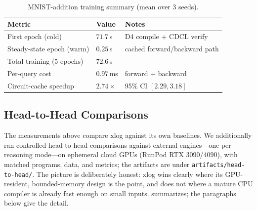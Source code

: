 \begin{table}[htbp]
  \centering
  \caption{MNIST-addition training summary (mean over 3 seeds).}
  \label{tab:training-summary}
  \small
  \begin{tabularx}{\linewidth}{@{}l l L@{}}
    \toprule
    \textbf{Metric} & \textbf{Value} & \textbf{Notes} \\
    \midrule
    First epoch (cold)         & $71.7$\,s  & D4 compile + CDCL verify \\
    Steady-state epoch (warm)  & $0.25$\,s  & cached forward/backward path \\
    Total training (5 epochs)  & $72.6$\,s  & \\
    Per-query cost             & $0.97$\,ms & forward + backward \\
    Circuit-cache speedup      & $2.74\times$ & 95\% CI $[2.29, 3.18]$ \\
    \bottomrule
  \end{tabularx}
\end{table}

\subsection{Head-to-Head Comparisons}\label{sec:h2h}

The measurements above compare xlog against its own baselines. We additionally ran controlled head-to-head comparisons against external engines---one per reasoning mode---on ephemeral cloud GPUs (RunPod RTX 3090/4090), with matched programs, data, and metrics; the artifacts are under \texttt{artifacts/head-to-head/}. The picture is deliberately honest: xlog wins clearly where its GPU-resident, bounded-memory design is the point, and does not where a mature CPU compiler is already fast enough on small inputs.  summarizes; the paragraphs below give the detail.

